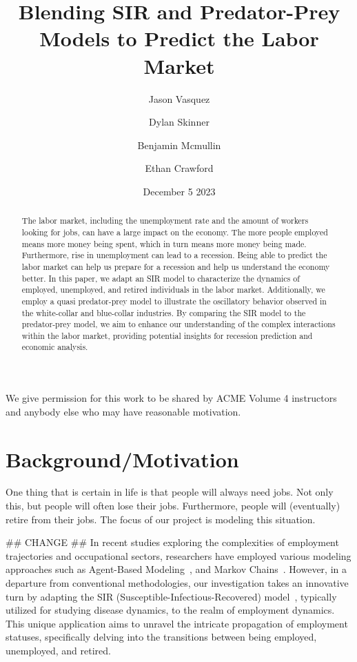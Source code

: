 \documentclass[11pt]{amsart}
\title{Blending SIR and Predator-Prey Models to Predict the Labor Market}
\author{Jason Vasquez \and Dylan Skinner \and Benjamin Mcmullin \and Ethan Crawford}
\date{December 5 2023}
\begin{document}
\begin{abstract}
    
    The labor market, including the unemployment rate and the amount of workers looking for jobs, can have a large impact on the economy.
    The more people employed means more money being spent, which in turn means more money being made. 
    Furthermore, rise in unemployment can lead to a recession. Being able to predict the labor market can help us prepare for a recession and help us understand the economy better.
    In this paper, we adapt an SIR model to characterize the dynamics of employed, unemployed, and retired individuals in the labor market. 
    Additionally, we employ a quasi predator-prey model to illustrate the oscillatory behavior observed in the white-collar and blue-collar industries. 
    By comparing the SIR model to the predator-prey model, we aim to enhance our understanding of the complex interactions within the labor market, 
    providing potential insights for recession prediction and economic analysis.
    
\end{abstract}

\maketitle

We give permission for this work to be shared by ACME Volume 4 instructors and anybody else who may have reasonable motivation.

\section{Background/Motivation}

One thing that is certain in life is that people will always need jobs. Not only this, but people 
will often lose their jobs. Furthermore, people will (eventually) retire from their jobs.
The focus of our project is modeling this situation.

## CHANGE ##
In recent studies exploring the complexities of employment trajectories and occupational sectors, researchers 
have employed various modeling approaches such as Agent-Based Modeling~\cite{neves2019innovation}, and Markov Chains~\cite{zais2016markov}. However, 
in a departure from conventional methodologies, our investigation takes an innovative turn by adapting 
the SIR (Susceptible-Infectious-Recovered) model~\cite{kermack1927contribution}, typically utilized for studying disease dynamics, to the 
realm of employment dynamics. This unique application aims to unravel the intricate propagation of employment 
statuses, specifically delving into the transitions between being employed, unemployed, and retired.
\end{document}
